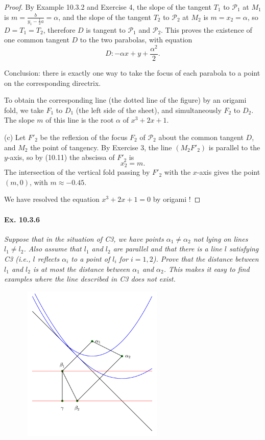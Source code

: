 \documentclass[11pt,a4paper]{article}
\begin{document}
\begin{proof}
By Example 10.3.2 and Exercise 4, the slope of the tangent $T_1$ to ${\mathscr P} _1$ at $M_1$ is $m = \frac{b}{y_1-\frac{1}{2}a} = \alpha$, and the slope of the tangent $T_2$ to ${\mathscr P} _2$ at $M_2$ is $m = x_2 = \alpha$, so $D = T_1 = T_2$, therefore $D$ is tangent to ${\mathscr P} _1$ and ${\mathscr P} _2$. This proves the existence of one common tangent $D$ to the two parabolas, with equation
$$D : -\alpha x + y +\frac{\alpha^2}{2}.$$

Conclusion: there is exactly one way to take the focus of each parabola to a point on the corresponding directrix.

To obtain the corresponding line (the dotted line of the figure) by an origami fold, we take $F_1$ to $D_1$ (the left side of the sheet), and simultaneously $F_2$ to $D_2$. The slope $m$ of this line is the root $\alpha$ of $x^3 + 2x +1$.


\item[(c)] Let $F'_2$ be the reflexion of the focus $F_2$ of ${\mathscr P} _2$ about the common tangent $D$, and $M_2$ the point of tangency. By Exercise 3, the line $(M_2F'_2)$ is parallel to the $y$-axis, so by (10.11) the abscissa of $F'_2$ is $$x_2 =m.$$
 The intersection of the vertical fold  passing by $F'_2$ with the $x$-axis gives the point $(m,0)$, with $m\approx -0.45$. 
 
 We have resolved the equation $x^3 + 2x + 1 = 0$ by origami !
 
\end{proof}

\paragraph{Ex. 10.3.6}

{\it Suppose that in the situation of C3, we have points $\alpha_1\ne \alpha_2$ not lying on lines $l_1\ne l_2$. Also assume that $l_1$ and $l_2$ are parallel and that there is a line $l$ satisfying C3 (i.e., $l$ reflects $\alpha_i$ to a point of $l_i$ for $i=1,2$). Prove that the distance between $l_1$ and $l_2$ is at most the distance between $\alpha_1$ and $\alpha_2$. This makes it easy to find examples where the line described in C3 does not exist.
}

\begin{figure}[htbp]
\begin{center}
\includegraphics [width=7cm,height=7.5cm]  {parabolas0.pdf}
\end{center}
\end{figure}
\end{document}

